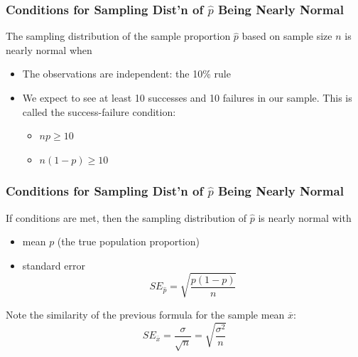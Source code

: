 \documentclass[slides]{beamer}
\newcommand{\blue}[1]{\textcolor{blue2}{#1}}
\newcommand{\xbar}{\overline{x}}
\newcommand{\phat}{\widehat{p}}
\begin{document}
\begin{frame}[fragile]
\frametitle{Conditions for Sampling Dist'n of $\phat$ Being Nearly Normal}
%
%
The sampling distribution of the \blue{sample proportion} $\phat$ based on sample size $n$ is nearly normal when

\begin{itemize}
\pause \item The observations are independent:  the 10\% rule
\pause \item We expect to see at least 10 successes and 10 failures in our sample.  This is called the \blue{success-failure condition}:
\begin{itemize}
\item $np \geq 10$
\item $n(1-p) \geq 10$ 
\end{itemize}
\end{itemize}

\end{frame}


\begin{frame}[fragile]
\frametitle{Conditions for Sampling Dist'n of $\phat$ Being Nearly Normal}

%
%
If conditions are met, then the sampling distribution of $\phat$ is nearly normal with
\begin{itemize}
\item mean $p$ (the true population proportion)
\item standard error
\[
SE_{\phat} = \sqrt{\frac{p(1-p)}{n}}
\]
\end{itemize}

\pause Note the similarity of the previous formula for the sample mean $\xbar$: 
\[
SE_{\xbar} = \frac{\sigma}{\sqrt{n}} = \sqrt{\frac{\sigma^2}{n}}
\]

\end{frame}
\end{document}
